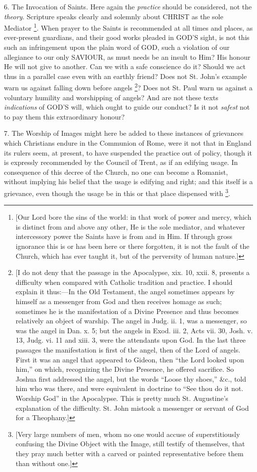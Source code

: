 6. The Invocation of Saints. Here again the \emph{practice}
should be considered, not the \emph{theory}. Scripture speaks clearly and
solemnly about CHRIST as
the sole Mediator \footnote{[Our Lord bore the sins of the world: in that work of power and mercy,
which is distinct from and above any other, He is the sole mediator,
and whatever intercessory power the Saints have is from and in Him. If
through gross ignorance this is or has been here or there forgotten,
it is not the fault of the Church, which has ever taught it, but of
the perversity of human nature.]}. When prayer to the Saints is recommended at all times and places, as
ever-present guardians, and their good works pleaded in GOD'S
sight, is not this such an infringement upon the plain word of GOD,
such a violation of our allegiance to our only SAVIOUR,
as must needs be an insult to Him? His honour He will not give to
another. Can we with a safe conscience do it? Should we act thus in a
parallel case even with an earthly friend? Does not St. John's example
warn us against falling down before angels \footnote{[I do not deny that the passage in the Apocalypse, xix. 10, xxii. 8,
presents a difficulty when compared with Catholic tradition and
practice. I should explain it thus:—In the Old Testament, the angel
sometimes appears by himself as a messenger from God and then receives
homage as such; sometimes he is the manifestation of a Divine Presence
and thus becomes relatively an object of warship. The angel in Judg.
ii. 1, was a messenger, so was the angel in Dan. x. 5; but the angels
in Exod. iii. 2, Acts vii. 30, Josh. v. 13, Judg. vi. 11 and xiii. 3,
were the attendants upon God. In the last three passages the
manifestation is first of the angel, then of the Lord of angels. First
it was an angel that appeared to Gideon, then ``the Lord looked upon
him,'' on which, recognizing the Divine Presence, he offered sacrifice.
So Joshua first addressed the angel, but the words ``Loose thy shoes,''
\&c., told him who was there, and were equivalent in doctrine to ``See
thou do it not. Worship God'' in the Apocalypse. This is pretty much
St. Augustine's explanation of the difficulty. St. John mistook a
messenger or servant of God for a Theophany.]}? Does not St. Paul warn us against a voluntary humility and
worshipping of angels? And are not these texts \emph{indications} of GOD'S
will, which ought to guide our conduct? Is it not \emph{safest} not to
pay them this extraordinary honour?

7. The Worship of Images might here be added to
these instances of grievances which Christians endure in the Communion
of Rome, were it not that in England its rulers seem, at present, to
have suspended the practice out of policy, though it is expressly
recommended by the Council of Trent, as if an edifying usage. In
consequence of this decree of the Church, no one can become a
Romanist, without implying his belief that the usage is edifying
and right; and this itself is a grievance, even though the usage be in
this or that place dispensed with \footnote{[Very large numbers of men, whom no one would accuse of
superstitiously confusing the Divine Object with the Image, still
testify of themselves, that they pray much better with a carved or
painted representative before them than without one.]}.

